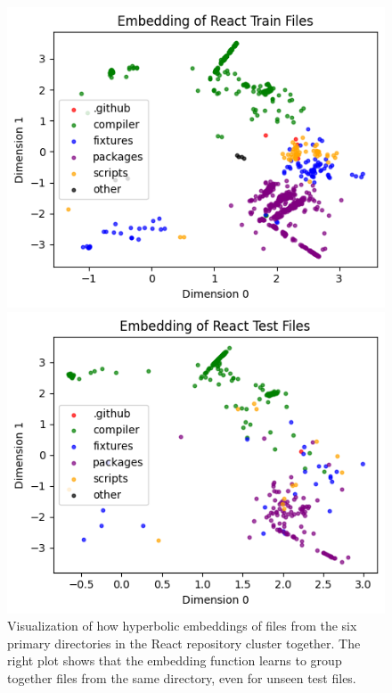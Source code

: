 \documentclass{article}
\begin{document}
\begin{figure}[H]
  \begin{minipage}{0.5\textwidth}
    \centering
    \includegraphics[width=\linewidth]{figures/react_train.png}
  \end{minipage}%
  \begin{minipage}{0.5\textwidth}
    \centering
    \includegraphics[width=\linewidth]{figures/react_test.png}
  \end{minipage}
  \caption{Visualization of how hyperbolic embeddings of files from the six primary directories in the React repository cluster together. The right plot shows that the embedding function learns to group together files from the same directory, even for unseen test files.}
  \label{fig:React-training-and-test-embeddings}
\end{figure}
\end{document}
